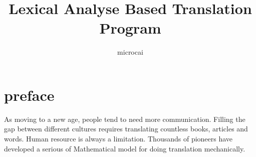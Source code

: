 \documentclass[a4paper]{article}
\title{Lexical Analyse Based Translation Program}
\author{microcai}
\begin{document}
\part*{preface}

As moving to a new age, people tend to need more communication. Filling the gap between different cultures requires translating countless books, articles and words. Human resource is always a limitation. Thousands of 
pioneers have developed a serious of Mathematical model for doing translation mechanically. 
\end{document}
